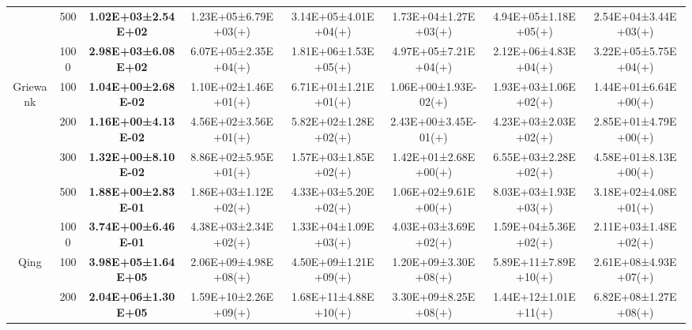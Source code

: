 \begin{tabular}{|cc|c|c|c|c|c|c|}
\multicolumn{1}{|c|}{}                            & 500       & \textbf{1.02E+03±2.54E+02} & 1.23E+05±6.79E+03($+$) & 3.14E+05±4.01E+04($+$) & 1.73E+04±1.27E+03($+$)                & 4.94E+05±1.18E+05($+$) & 2.54E+04±3.44E+03($+$)          \\ \cline{2-8} 
\multicolumn{1}{|c|}{}                            & 1000      & \textbf{2.98E+03±6.08E+02} & 6.07E+05±2.35E+04($+$) & 1.81E+06±1.53E+05($+$) & 4.97E+05±7.21E+04($+$)                & 2.12E+06±4.83E+04($+$) & 3.22E+05±5.75E+04($+$)          \\ \hline
\multicolumn{1}{|c|}{\multirow{5}{*}{Griewank}}   & 100       & \textbf{1.04E+00±2.68E-02} & 1.10E+02±1.46E+01($+$) & 6.71E+01±1.21E+01($+$) & 1.06E+00±1.93E-02($+$)                & 1.93E+03±1.06E+02($+$) & 1.44E+01±6.64E+00($+$)          \\ \cline{2-8} 
\multicolumn{1}{|c|}{}                            & 200       & \textbf{1.16E+00±4.13E-02} & 4.56E+02±3.56E+01($+$) & 5.82E+02±1.28E+02($+$) & 2.43E+00±3.45E-01($+$)                & 4.23E+03±2.03E+02($+$) & 2.85E+01±4.79E+00($+$)          \\ \cline{2-8} 
\multicolumn{1}{|c|}{}                            & 300       & \textbf{1.32E+00±8.10E-02} & 8.86E+02±5.95E+01($+$) & 1.57E+03±1.85E+02($+$) & 1.42E+01±2.68E+00($+$)                & 6.55E+03±2.28E+02($+$) & 4.58E+01±8.13E+00($+$)          \\ \cline{2-8} 
\multicolumn{1}{|c|}{}                            & 500       & \textbf{1.88E+00±2.83E-01} & 1.86E+03±1.12E+02($+$) & 4.33E+03±5.20E+02($+$) & 1.06E+02±9.61E+00($+$)                & 8.03E+03±1.93E+03($+$) & 3.18E+02±4.08E+01($+$)          \\ \cline{2-8} 
\multicolumn{1}{|c|}{}                            & 1000      & \textbf{3.74E+00±6.46E-01} & 4.38E+03±2.34E+02($+$) & 1.33E+04±1.09E+03($+$) & 4.03E+03±3.69E+02($+$)                & 1.59E+04±5.36E+02($+$) & 2.11E+03±1.48E+02($+$)          \\ \hline
\multicolumn{1}{|c|}{\multirow{5}{*}{Qing}}       & 100       & \textbf{3.98E+05±1.64E+05} & 2.06E+09±4.98E+08($+$) & 4.50E+09±1.21E+09($+$) & 1.20E+09±3.30E+08($+$)                & 5.89E+11±7.89E+10($+$) & 2.61E+08±4.93E+07($+$)          \\ \cline{2-8} 
\multicolumn{1}{|c|}{}                            & 200       & \textbf{2.04E+06±1.30E+05} & 1.59E+10±2.26E+09($+$) & 1.68E+11±4.88E+10($+$) & 3.30E+09±8.25E+08($+$)                & 1.44E+12±1.01E+11($+$) & 6.82E+08±1.27E+08($+$)          \\ \cline{2-8} 

\end{tabular}
